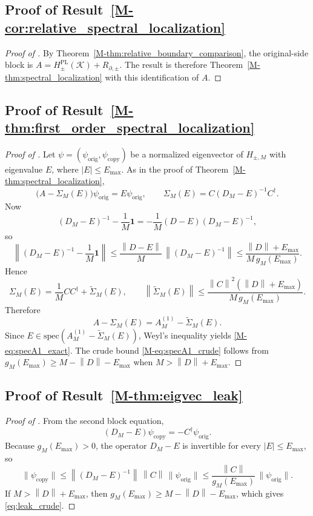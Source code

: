 \documentclass[11pt]{article}
\numberwithin{equation}{section}
\theoremstyle{definition}
\theoremstyle{remark}
\newcommand{\K}{\mathcal{K}}
\newcommand{\Id}{\mathbf{1}}
\newcommand{\spec}{\mathrm{spec}}
\newcommand{\opnorm}[1]{\left\lVert#1\right\rVert}
\begin{document}
\subsection{Proof of Result~\ref{M-cor:relative_spectral_localization}}\label{app:proof:cor:relative_spectral_localization}
\begin{proof}[Proof of ]
By Theorem~\ref{M-thm:relative_boundary_comparison}, the original-side block is
\(A=H^{\mathrm{PL}}_{\pm}(\K)+R_{\partial,\pm}\). The result is therefore
Theorem~\ref{M-thm:spectral_localization} with this identification of \(A\).
\end{proof}

\subsection{Proof of Result~\ref{M-thm:first_order_spectral_localization}}\label{app:proof:thm:first_order_spectral_localization}
\begin{proof}[Proof of ]
Let $\psi=(\psi_{\mathrm{orig}},\psi_{\mathrm{copy}})$ be a normalized eigenvector of $H_{\pm,M}$ with eigenvalue $E$, where $|E|\le E_{\max}$. As in the proof of Theorem~\ref{M-thm:spectral_localization},
\[
\bigl(A-\Sigma_M(E)\bigr)\psi_{\mathrm{orig}}=E\psi_{\mathrm{orig}},
\qquad
\Sigma_M(E)=C(D_M-E)^{-1}C^\dagger.
\]
Now
\[
(D_M-E)^{-1}-\frac1M\Id
=
-\frac1M(D-E)(D_M-E)^{-1},
\]
so
\[
\opnorm{(D_M-E)^{-1}-\frac1M\Id}
\le
\frac{\opnorm{D-E}}{M}\,\opnorm{(D_M-E)^{-1}}
\le
\frac{\opnorm{D}+E_{\max}}{M\,g_M(E_{\max})}.
\]
Hence
\[
\Sigma_M(E)=\frac1MCC^\dagger+\widetilde\Sigma_M(E),
\qquad
\opnorm{\widetilde\Sigma_M(E)}
\le
\frac{\opnorm{C}^2(\opnorm{D}+E_{\max})}{M\,g_M(E_{\max})}.
\]
Therefore
\[
A-\Sigma_M(E)=A_M^{(1)}-\widetilde\Sigma_M(E).
\]
Since $E\in\spec(A_M^{(1)}-\widetilde\Sigma_M(E))$, Weyl's inequality yields \eqref{M-eq:specA1_exact}. The crude bound \eqref{M-eq:specA1_crude} follows from $g_M(E_{\max})\ge M-\opnorm{D}-E_{\max}$ when $M>\opnorm{D}+E_{\max}$.
\end{proof}

\subsection{Proof of Result~\ref{M-thm:eigvec_leak}}\label{app:proof:thm:eigvec_leak}
\begin{proof}[Proof of ]
From the second block equation,
\[
(D_M-E)\psi_{\mathrm{copy}}=-C^\dagger\psi_{\mathrm{orig}}.
\]
Because $g_M(E_{\max})>0$, the operator $D_M-E$ is invertible for every $|E|\le E_{\max}$, so
\[
\|\psi_{\mathrm{copy}}\|
\le
\opnorm{(D_M-E)^{-1}}\,\opnorm{C}\,\|\psi_{\mathrm{orig}}\|
\le
\frac{\opnorm{C}}{g_M(E_{\max})}\,\|\psi_{\mathrm{orig}}\|.
\]
If $M>\opnorm{D}+E_{\max}$, then $g_M(E_{\max})\ge M-\opnorm{D}-E_{\max}$, which gives \eqref{eq:leak_crude}.
\end{proof}
\end{document}
